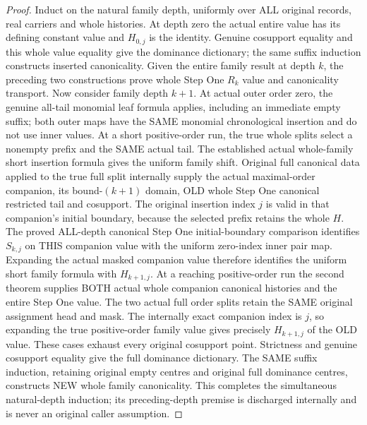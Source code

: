 \begin{proof}
Induct on the natural family depth, uniformly over ALL original records,
real carriers and whole histories. At depth zero the actual entire value
has its defining constant value and $H_{0,j}$ is the identity. Genuine
cosupport equality and this whole value equality give the dominance dictionary;
the same suffix induction constructs inserted canonicality.
Given the entire family result at depth $k$, the preceding two constructions
prove whole Step One $R_k$ value and canonicality transport. Now consider
family depth $k+1$. At actual outer order zero, the genuine all-tail monomial
leaf formula applies, including an immediate empty suffix; both outer maps
have the SAME monomial chronological insertion and do not use inner values.
At a short positive-order run, the true whole splits select a nonempty prefix
and the SAME actual tail. The established actual whole-family short insertion
formula gives the uniform family shift. Original full canonical data applied
to the true full split internally supply the actual maximal-order companion,
its bound-$(k+1)$ domain, OLD whole Step One canonical restricted tail and
cosupport. The original insertion index $j$ is valid in that companion's
initial boundary, because the selected prefix retains the whole $H$.
The proved ALL-depth canonical Step One initial-boundary comparison identifies
$S_{k,j}$ on THIS companion value with the uniform zero-index inner pair map.
Expanding the actual masked companion value therefore identifies the uniform
short family formula with $H_{k+1,j}$.
At a reaching positive-order run the second theorem supplies BOTH actual whole
companion canonical histories and the entire Step One value. The two actual
full order splits retain the SAME original assignment head and mask. The
internally exact companion index is $j$, so expanding the true positive-order
family value gives precisely $H_{k+1,j}$ of the OLD value. These cases exhaust
every original cosupport point. Strictness and genuine cosupport equality
give the full dominance dictionary. The SAME suffix induction, retaining
original empty centres and original full dominance centres, constructs NEW
whole family canonicality. This completes the simultaneous natural-depth
induction; its preceding-depth premise is discharged internally and is never
an original caller assumption.
\end{proof}

